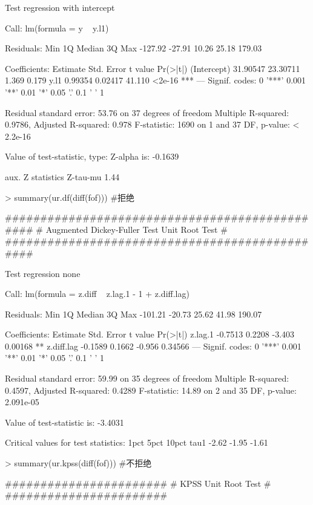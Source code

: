 \documentclass{article}
\begin{document}
\begin{Schunk}
\begin{Soutput}
Test regression with intercept 


Call:
lm(formula = y ~ y.l1)

Residuals:
    Min      1Q  Median      3Q     Max 
-127.92  -27.91   10.26   25.18  179.03 

Coefficients:
            Estimate Std. Error t value Pr(>|t|)    
(Intercept) 31.90547   23.30711   1.369    0.179    
y.l1         0.99354    0.02417  41.110   <2e-16 ***
---
Signif. codes:  0 '***' 0.001 '**' 0.01 '*' 0.05 '.' 0.1 ' ' 1

Residual standard error: 53.76 on 37 degrees of freedom
Multiple R-squared:  0.9786,	Adjusted R-squared:  0.978 
F-statistic:  1690 on 1 and 37 DF,  p-value: < 2.2e-16


Value of test-statistic, type: Z-alpha  is: -0.1639 

         aux. Z statistics
Z-tau-mu              1.44
\end{Soutput}
\begin{Sinput}
> summary(ur.df(diff(fof))) #拒绝
\end{Sinput}
\begin{Soutput}
############################################### 
# Augmented Dickey-Fuller Test Unit Root Test # 
############################################### 

Test regression none 


Call:
lm(formula = z.diff ~ z.lag.1 - 1 + z.diff.lag)

Residuals:
    Min      1Q  Median      3Q     Max 
-101.21  -20.73   25.62   41.98  190.07 

Coefficients:
           Estimate Std. Error t value Pr(>|t|)   
z.lag.1     -0.7513     0.2208  -3.403  0.00168 **
z.diff.lag  -0.1589     0.1662  -0.956  0.34566   
---
Signif. codes:  0 '***' 0.001 '**' 0.01 '*' 0.05 '.' 0.1 ' ' 1

Residual standard error: 59.99 on 35 degrees of freedom
Multiple R-squared:  0.4597,	Adjusted R-squared:  0.4289 
F-statistic: 14.89 on 2 and 35 DF,  p-value: 2.091e-05


Value of test-statistic is: -3.4031 

Critical values for test statistics: 
      1pct  5pct 10pct
tau1 -2.62 -1.95 -1.61
\end{Soutput}
\begin{Sinput}
> summary(ur.kpss(diff(fof))) #不拒绝
\end{Sinput}
\begin{Soutput}
####################### 
# KPSS Unit Root Test # 
####################### 


\end{Soutput}
\end{Schunk}
\end{document}
